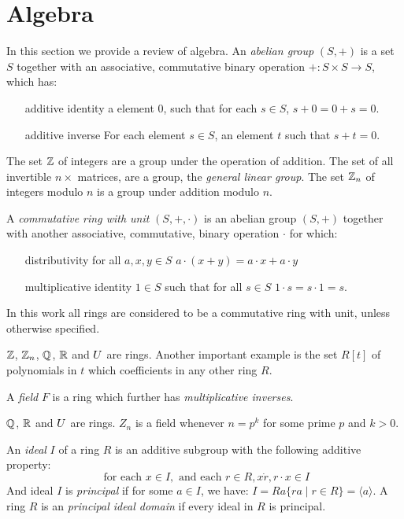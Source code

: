 \section{Algebra}
In this section we provide a review of algebra. An \emph{abelian group} $(S,+)$ is a set $S$ together with an associative, commutative binary operation $+: S \times S \rightarrow S$, which has:
\begin{itemize}
\item[additive identity] a element $0$, such that for each $s \in S$, $s+0 = 0+s = 0$.
\item[additive inverse] For each element $s \in S$, an element $t$ such that $s+t = 0$.
\end{itemize}
\begin{example}
The set $\mathbb{Z}$ of integers are a group under the operation of addition. The set of all invertible $n \times $ matrices, are a group, the \emph{general linear group}.
The set $\mathbb{Z}_n$ of integers modulo $n$ is a group under addition modulo $n$.
\end{example}
A \emph{commutative ring with unit} $(S,+,\cdot)$ is an abelian group $(S,+)$  together with another associative, commutative, binary operation $\cdot$ for which:
\begin{itemize}
\item[distributivity] for all $a,x,y \in S$ $a \cdot (x + y)  = a \cdot x + a \cdot y$ 
\item[multiplicative identity] $1 \in S$ such that for all $s \in S$ $1 \cdot s = s \cdot 1 = s$. 
\end{itemize}
In this work all rings are considered to be a commutative ring with unit, unless otherwise specified.  
\begin{example}
$\mathbb{Z}$, $\mathbb{Z}_n$, $\mathbb{Q}$, $\mathbb{R}$ and $U$ are rings. Another important example is the set $R[t]$ of polynomials in $t$ which coefficients in any other ring $R$.
\end{example}
A \emph{field} $F$ is a ring which further has \emph{multiplicative inverses}.
\begin{example}
$\mathbb{Q}$, $\mathbb{R}$ and $U$ are rings.  $Z_n$ is a field whenever $n = p^k$ for some prime $p$ and $k > 0$.
\end{example}
An \emph{ideal} $I$ of a ring $R$ is an additive subgroup with the following additive property:
\[ \textrm{ for each } x \in I, \textrm{ and each } r \in R, x \dot r, r \cdot x \in I  \]
And ideal $I$ is \emph{principal} if for some $a \in I$, we have: $I = Ra \{ ra \mid r \in R\} = \langle a \rangle$.
A ring $R$ is an \emph{principal ideal domain} if every ideal in $R$ is principal.
